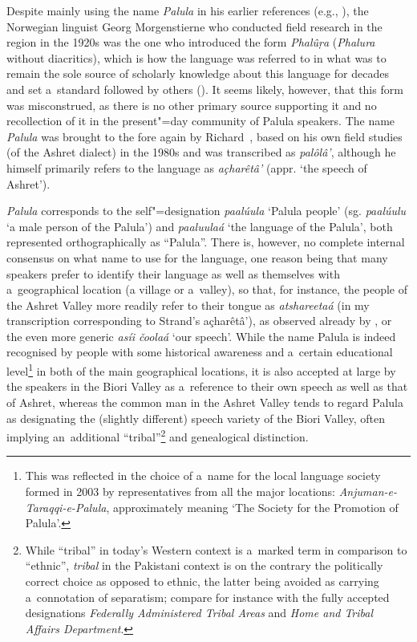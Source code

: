 Despite mainly using the name \textit{Palula} in his earlier references
(e.g., \citeyear[54--59]{morgenstierne1932}), the Norwegian linguist Georg Morgenstierne who conducted
field research in the region in the 1920s \citep{morgenstiernelorentzen1992} was the one who introduced the form \textit{Phalûṛa}
(\textit{Phalura} without diacritics), which is how the language was referred to in what was to
remain the sole source of scholarly knowledge about this language for decades
\citep{morgenstierne1941} and set a~standard followed by others
(\citealt{buddruss1967,edelman1983,masica1991,decker1992a}). It seems likely,
however, that this form was misconstrued, as there is no other primary source supporting it and no
recollection of it in the present"=day community of Palula speakers. The name \textit{Palula} was brought to the fore again by Richard~\citet{strand1997/2015}, based on
his own field studies (of the Ashret dialect) in the 1980s and was transcribed as \textit{palôlâ'}, although he himself primarily
refers to the language as \textit{açharêtâ'} (appr. `the speech of Ashret').


\textit{Palula} corresponds to the self"=designation \textit{paalúula} `Palula people'
(sg. \textit{paalúulu} `a male person of the Palula') and \textit{paaluulaá} `the language
of the Palula', both represented orthographically as ``Palula''. There is, however, no complete
internal consensus on what name to use for the language, one reason being that many speakers prefer
to identify their language as well as themselves with a~geographical location (a village or
a~valley), so that, for instance, the people of the Ashret Valley more readily refer to their tongue
as \textit{atshareetaá} (in my transcription corresponding to Strand's
açharêtâ'), as observed already by \citet{morgenstierne1941}, or the even more
generic \textit{asíi čoolaá} `our speech'. While the name Palula is indeed recognised by
people with some historical awareness and a~certain educational level\footnote{This was reflected in
  the choice of a~name for the local language society formed in 2003 by representatives from all the
  major locations: \textit{Anjuman-e-Taraqqi-e-Palula}, approximately meaning `The Society for the Promotion of Palula'.} in both of the main geographical locations, it is also accepted at large by the speakers
in the Biori Valley as a~reference to their own speech as well as that of Ashret, whereas the common
man in the Ashret Valley tends to regard Palula as designating the (slightly different) speech
variety of the Biori Valley, often implying an~additional ``tribal''\footnote{While ``tribal'' in
  today's Western context is a~marked term in comparison to ``ethnic'', \textit{tribal} in the
  Pakistani context is on the contrary the politically correct choice as opposed to ethnic, the
  latter being avoided as carrying a~connotation of separatism; compare for instance with the fully accepted designations
  \textit{Federally Administered Tribal Areas} and \textit{Home and Tribal Affairs Department}.} and
genealogical distinction.


